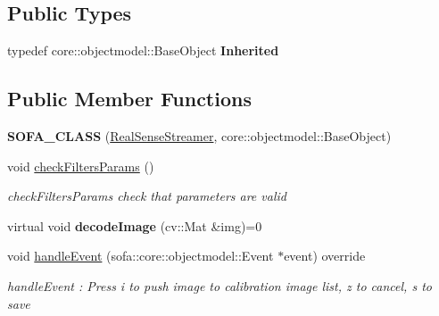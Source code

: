 \subsection*{Public Types}
\begin{DoxyCompactItemize}
\item 
\mbox{\label{classsofa_1_1rgbdtracking_1_1_real_sense_streamer_a8aa819130f6e6f0b1b340cbe5603de33}} 
typedef core\+::objectmodel\+::\+Base\+Object {\bfseries Inherited}
\end{DoxyCompactItemize}
\subsection*{Public Member Functions}
\begin{DoxyCompactItemize}
\item 
\mbox{\label{classsofa_1_1rgbdtracking_1_1_real_sense_streamer_a7b90febcc49cbf552ebea16310254b64}} 
{\bfseries S\+O\+F\+A\+\_\+\+C\+L\+A\+SS} (\hyperlink{classsofa_1_1rgbdtracking_1_1_real_sense_streamer}{Real\+Sense\+Streamer}, core\+::objectmodel\+::\+Base\+Object)
\item 
\mbox{\label{classsofa_1_1rgbdtracking_1_1_real_sense_streamer_aac9f0bde89d30d6210c573b9c3fa8aad}} 
void \hyperlink{classsofa_1_1rgbdtracking_1_1_real_sense_streamer_aac9f0bde89d30d6210c573b9c3fa8aad}{check\+Filters\+Params} ()
\begin{DoxyCompactList}\small\item\em check\+Filters\+Params check that parameters are valid \end{DoxyCompactList}\item 
\mbox{\label{classsofa_1_1rgbdtracking_1_1_real_sense_streamer_a754808db53fd4a2bc6982d9e0aae61be}} 
virtual void {\bfseries decode\+Image} (cv\+::\+Mat \&img)=0
\item 
void \hyperlink{classsofa_1_1rgbdtracking_1_1_real_sense_streamer_a3881452d7c26ef825640220be00fd034}{handle\+Event} (sofa\+::core\+::objectmodel\+::\+Event $\ast$event) override
\begin{DoxyCompactList}\small\item\em handle\+Event \+: Press i to push image to calibration image list, z to cancel, s to save \end{DoxyCompactList}\end{DoxyCompactItemize}
